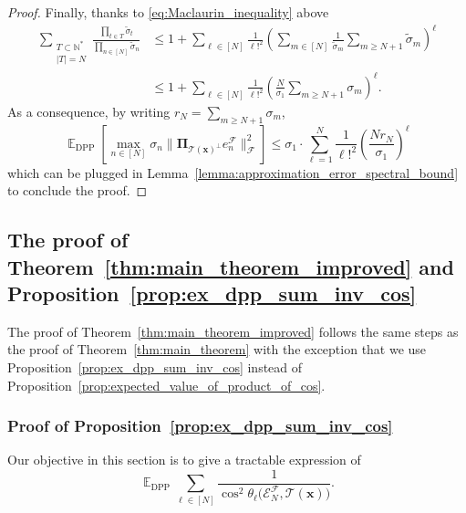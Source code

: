 \documentclass[twoside,11pt]{book}
\numberwithin{theorem}{chapter}
\numberwithin{definition}{chapter}
\numberwithin{proposition}{chapter}
\numberwithin{corollary}{chapter}
\numberwithin{example}{chapter}
\numberwithin{lemma}{chapter}
\numberwithin{assumption}{chapter}
\DeclareMathOperator{\DPP}{\mathrm{DPP}}
\DeclareMathOperator{\EX}{\mathbb{E}}
\begin{document}
\begin{proof}
%
Finally, thanks to \eqref{eq:Maclaurin_inequality} above
\begin{align}
  \sum\limits_{\substack{T \subset \mathbb{N}^{*} \\ |T| = N}} \frac{ \prod\limits_{t \in T}\tilde{\sigma}_{t}}{\prod\limits_{n \in [N]} \tilde{\sigma}_{n}}
  & \leq  1 + \sum\limits_{\ell \in [N]} \frac{1}{\ell!^{2}} \left(\sum\limits_{m \in [N]}\frac{1}{\tilde{\sigma}_{m}} \sum\limits_{m \geq N+1} \tilde{\sigma}_{m}\right)^{\ell} \\
  & \leq 1+ \sum\limits_{\ell \in [N]} \frac{1}{\ell!^{2}} \left(\frac{N}{\sigma_1} \sum\limits_{m \geq N+1} \sigma_{m}\right)^{\ell} \nonumber.
\end{align}
%
As a consequence, by writing $r_{N} = \sum\limits_{m \geq N+1} \sigma_{m}$,
\begin{equation}
  \EX_{\DPP} \left[ \max_{ n \in [N]}\sigma_n \|\bm{\Pi}_{\mathcal{T}(\bm{x})^{\perp}} e_{n}^{\mathcal{F}}\|_{\mathcal{F}}^{2} \right]
  \leq
  \sigma_1 \cdot \sum_{\ell=1}^{N} \frac{1}{\ell!^{2}} \left(\frac{N  r_{N} }{\sigma_1}\right)^{\ell}
\end{equation}
which can be plugged in Lemma~\ref{lemma:approximation_error_spectral_bound} to conclude the proof.
\end{proof}


\subsection{The proof of Theorem~\ref{thm:main_theorem_improved} and Proposition~\ref{prop:ex_dpp_sum_inv_cos}}\label{sec:dppkq_last_proof}

The proof of Theorem~\ref{thm:main_theorem_improved} follows the same steps as the proof of Theorem~\ref{thm:main_theorem} with the exception that we use Proposition~\ref{prop:ex_dpp_sum_inv_cos} instead of Proposition~\ref{prop:expected_value_of_product_of_cos}.


\subsubsection{Proof of Proposition~\ref{prop:ex_dpp_sum_inv_cos}}
Our objective in this section is to give a tractable expression of 
\begin{equation}
\EX_{\DPP} \sum\limits_{\ell \in [N]} \frac{1}{\cos^{2} \theta_{\ell} \bigg(\mathcal{E}^{\mathcal{F}}_{N}, \mathcal{T}(\bm{x}) \bigg)}.
\end{equation}
\end{document}
